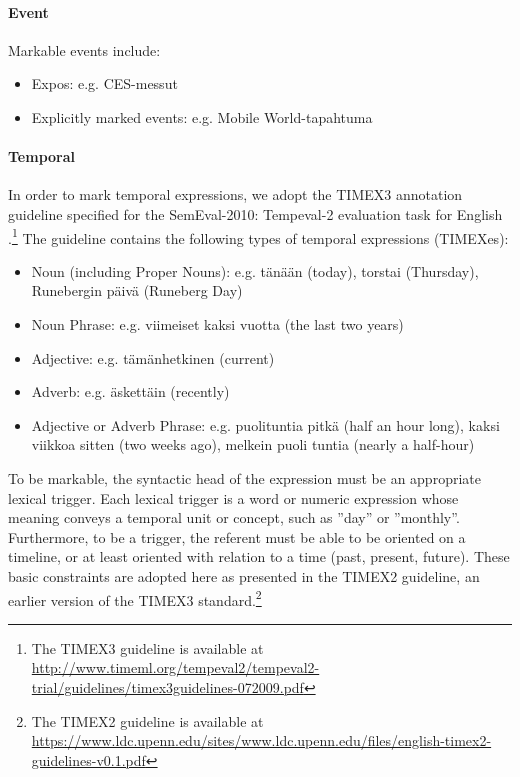 \documentclass[11pt]{article}
\begin{document}
\paragraph{Event}

Markable events include:

\begin{itemize}

\item[1.] Expos: e.g. CES-messut
\item[1.] Explicitly marked events: e.g. Mobile World-tapahtuma

\end{itemize}



\paragraph{Temporal}

In order to mark temporal expressions, we adopt the TIMEX3 annotation guideline specified for the SemEval-2010: Tempeval-2 evaluation task for English \citep{verhagen2010}.\footnote{The TIMEX3 guideline is available at \url{http://www.timeml.org/tempeval2/tempeval2-trial/guidelines/timex3guidelines-072009.pdf}} The guideline contains the following types of temporal expressions (TIMEXes): 

\begin{itemize}

\item[1.] Noun (including Proper Nouns): e.g. t\"an\"a\"an (today), torstai (Thursday), Runebergin p\"aiv\"a (Runeberg Day)
\item[2.] Noun Phrase: e.g. viimeiset kaksi vuotta (the last two years)
\item[3.] Adjective: e.g. t\"am\"anhetkinen (current)
\item[4.] Adverb: e.g. \"askett\"ain (recently)
\item[5.] Adjective or Adverb Phrase: e.g. puolituntia pitk\"a (half an hour long), kaksi viikkoa sitten (two weeks ago), melkein puoli tuntia (nearly a half-hour)

\end{itemize}
 
To be markable, the syntactic head of the expression must be an appropriate lexical trigger. Each lexical trigger is a word or numeric expression whose meaning conveys a temporal unit or concept, such as ''day'' or ''monthly''. Furthermore, to be a trigger, the referent must be able to be oriented on a timeline, or at least oriented with relation to a time (past, present, future). These basic constraints are adopted here as presented in the TIMEX2 guideline, an earlier version of the TIMEX3 standard.\footnote{The TIMEX2 guideline is available at \url{https://www.ldc.upenn.edu/sites/www.ldc.upenn.edu/files/english-timex2-guidelines-v0.1.pdf}} 
\end{document}
